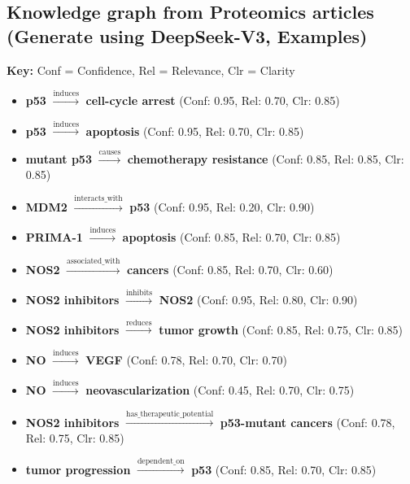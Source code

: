 \documentclass{article}
\begin{document}
\subsection{Knowledge graph from Proteomics articles (Generate using DeepSeek-V3, Examples)}
\label{subsec:kg-proteomics}
\vspace{2mm}
\begin{tcolorbox}[
    colframe=black!25,
    colback=black!5,
    boxrule=0.5pt,
    arc=2pt,
    title=Proteomics Knowledge Graph Triples,
    fonttitle=\bfseries,
    coltitle=black,
    ]
\small
\textbf{Key:} Conf = Confidence, Rel = Relevance, Clr = Clarity\\

\begin{itemize}
    \item \textbf{p53} $\xrightarrow{\text{induces}}$ \textbf{cell-cycle arrest} (Conf: 0.95, Rel: 0.70, Clr: 0.85)
    \item \textbf{p53} $\xrightarrow{\text{induces}}$ \textbf{apoptosis} (Conf: 0.95, Rel: 0.70, Clr: 0.85)
    \item \textbf{mutant p53} $\xrightarrow{\text{causes}}$ \textbf{chemotherapy resistance} (Conf: 0.85, Rel: 0.85, Clr: 0.85)
    \item \textbf{MDM2} $\xrightarrow{\text{interacts\_with}}$ \textbf{p53} (Conf: 0.95, Rel: 0.20, Clr: 0.90)
    \item \textbf{PRIMA-1} $\xrightarrow{\text{induces}}$ \textbf{apoptosis} (Conf: 0.85, Rel: 0.70, Clr: 0.85)
    \item \textbf{NOS2} $\xrightarrow{\text{associated\_with}}$ \textbf{cancers} (Conf: 0.85, Rel: 0.70, Clr: 0.60)
    \item \textbf{NOS2 inhibitors} $\xrightarrow{\text{inhibits}}$ \textbf{NOS2} (Conf: 0.95, Rel: 0.80, Clr: 0.90)
    \item \textbf{NOS2 inhibitors} $\xrightarrow{\text{reduces}}$ \textbf{tumor growth} (Conf: 0.85, Rel: 0.75, Clr: 0.85)
    \item \textbf{NO} $\xrightarrow{\text{induces}}$ \textbf{VEGF} (Conf: 0.78, Rel: 0.70, Clr: 0.70)
    \item \textbf{NO} $\xrightarrow{\text{induces}}$ \textbf{neovascularization} (Conf: 0.45, Rel: 0.70, Clr: 0.75)
    \item \textbf{NOS2 inhibitors} $\xrightarrow{\text{has\_therapeutic\_potential}}$ \textbf{p53-mutant cancers} (Conf: 0.78, Rel: 0.75, Clr: 0.85)
    \item \textbf{tumor progression} $\xrightarrow{\text{dependent\_on}}$ \textbf{p53} (Conf: 0.85, Rel: 0.70, Clr: 0.85)

\end{itemize}
\end{tcolorbox}
\end{document}
